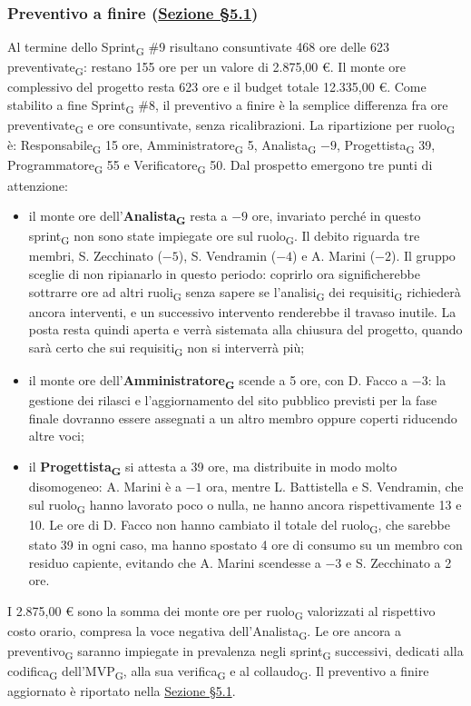 ﻿\documentclass[a4paper, 10pt, colorlinks=true, linkcolor=black, urlcolor=blue, citecolor=blue, hidelinks]{article}
\begin{document}
\subsubsection{Preventivo a finire (\hyperref[tab:preventivo-finire]{Sezione \S5.1})}
Al termine dello Sprint\textsubscript{G} \#9 risultano consuntivate 468 ore delle 623 preventivate\textsubscript{G}: restano 155 ore per un valore di 2.875,00 €. Il monte ore complessivo del progetto resta 623 ore e il budget totale 12.335,00 €.
Come stabilito a fine Sprint\textsubscript{G} \#8, il preventivo a finire è la semplice differenza fra ore preventivate\textsubscript{G} e ore consuntivate, senza ricalibrazioni. La ripartizione per ruolo\textsubscript{G} è: Responsabile\textsubscript{G} 15 ore, Amministratore\textsubscript{G} 5, Analista\textsubscript{G} $-9$, Progettista\textsubscript{G} 39, Programmatore\textsubscript{G} 55 e Verificatore\textsubscript{G} 50.
Dal prospetto emergono tre punti di attenzione:
\begin{itemize}
    \item il monte ore dell'\textbf{Analista\textsubscript{G}} resta a $-9$ ore, invariato perché in questo sprint\textsubscript{G} non sono state impiegate ore sul ruolo\textsubscript{G}. Il debito riguarda tre membri, S. Zecchinato ($-5$), S. Vendramin ($-4$) e A. Marini ($-2$). Il gruppo sceglie di non ripianarlo in questo periodo: coprirlo ora significherebbe sottrarre ore ad altri ruoli\textsubscript{G} senza sapere se l'analisi\textsubscript{G} dei requisiti\textsubscript{G} richiederà ancora interventi, e un successivo intervento renderebbe il travaso inutile. La posta resta quindi aperta e verrà sistemata alla chiusura del progetto, quando sarà certo che sui requisiti\textsubscript{G} non si interverrà più;

    \item il monte ore dell'\textbf{Amministratore\textsubscript{G}} scende a 5 ore, con D. Facco a $-3$: la gestione dei rilasci e l'aggiornamento del sito pubblico previsti per la fase finale dovranno essere assegnati a un altro membro oppure coperti riducendo altre voci;

    \item il \textbf{Progettista\textsubscript{G}} si attesta a 39 ore, ma distribuite in modo molto disomogeneo: A. Marini è a $-1$ ora, mentre L. Battistella e S. Vendramin, che sul ruolo\textsubscript{G} hanno lavorato poco o nulla, ne hanno ancora rispettivamente 13 e 10. Le ore di D. Facco non hanno cambiato il totale del ruolo\textsubscript{G}, che sarebbe stato 39 in ogni caso, ma hanno spostato 4 ore di consumo su un membro con residuo capiente, evitando che A. Marini scendesse a $-3$ e S. Zecchinato a 2 ore.
\end{itemize}
I 2.875,00 € sono la somma dei monte ore per ruolo\textsubscript{G} valorizzati al rispettivo costo orario, compresa la voce negativa dell'Analista\textsubscript{G}. Le ore ancora a preventivo\textsubscript{G} saranno impiegate in prevalenza negli sprint\textsubscript{G} successivi, dedicati alla codifica\textsubscript{G} dell'MVP\textsubscript{G}, alla sua verifica\textsubscript{G} e al collaudo\textsubscript{G}. Il preventivo a finire aggiornato è riportato nella \hyperref[tab:preventivo-finire]{Sezione \S5.1}.
\end{document}
